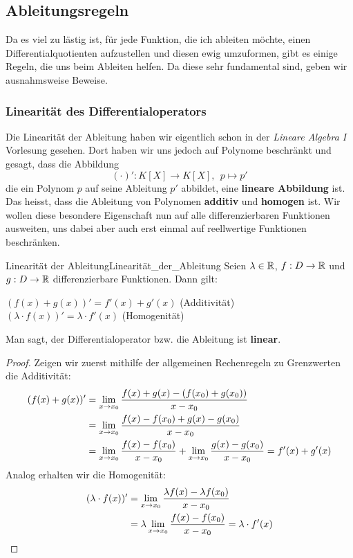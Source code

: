 \subsection{Ableitungsregeln}
Da es viel zu lästig ist, für jede Funktion, die ich ableiten möchte, einen Differentialquotienten aufzustellen und diesen ewig umzuformen, gibt es einige Regeln, die uns beim Ableiten helfen. Da diese sehr fundamental sind, geben wir ausnahmsweise Beweise.
\subsubsection{Linearität des Differentialoperators}
Die Linearität der Ableitung haben wir eigentlich schon in der \textit{Lineare Algebra I} Vorlesung gesehen. Dort haben wir uns jedoch auf Polynome beschränkt und gesagt, dass die Abbildung
$$(\cdot)': K[X] \to K[X], \ \ p \mapsto p'$$
die ein Polynom $p$ auf seine Ableitung $p'$ abbildet, eine \textbf{lineare Abbildung} ist. Das heisst, dass die Ableitung von Polynomen \textbf{additiv} und \textbf{homogen} ist. Wir wollen diese besondere Eigenschaft nun auf alle differenzierbaren Funktionen ausweiten, uns dabei aber auch erst einmal auf reellwertige Funktionen beschränken.
\begin{satz}{Linearität der Ableitung}{Linearität_der_Ableitung}
Seien $\lambda \in \mathbb{R}$, $f:D \to \mathbb{R}$ und $g:D \to \mathbb{R}$ differenzierbare Funktionen. Dann gilt:
\begin{center}
    $(f(x) + g(x))' = f'(x) + g'(x)$ \hfill (Additivität) \\
    $(\lambda \cdot f(x))' = \lambda \cdot f'(x)$  \hfill (Homogenität)
\end{center}
Man sagt, der Differentialoperator bzw. die Ableitung ist \textbf{linear}.
\end{satz}
\begin{proof}
Zeigen wir zuerst mithilfe der allgemeinen Rechenregeln zu Grenzwerten die Additivität:
\begin{align*}
   (f(x)+g(x))'&=\lim_{x \to x_0}\frac{f(x)+g(x)-(f(x_0)+g(x_0))}{x-x_0}\\
   &= \lim_{x \to x_0}\frac{f(x)-f(x_0)+g(x)-g(x_0)}{x-x_0}\\
   &= \lim_{x \to x_0}\frac{f(x)-f(x_0)}{x-x_0}+\lim_{x \to x_0}\frac{g(x)-g(x_0)}{x-x_0}=f'(x)+g'(x)
\end{align*}
Analog erhalten wir die Homogenität:
\begin{align*}
    (\lambda \cdot f(x))' &=\lim_{x \to x_0}\frac{\lambda f(x) - \lambda f(x_0)}{x-x_0}\\
    &=\lambda \lim_{x \to x_0}\frac{f(x)-f(x_0)}{x-x_0} = \lambda \cdot f'(x)
\end{align*}

\end{proof}

